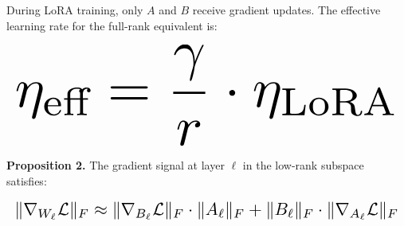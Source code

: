 \documentclass[10pt,twocolumn,letterpaper]{article}
\begin{document}
During LoRA training, only $A$ and $B$ receive gradient updates. The effective learning rate for the full-rank equivalent is:

























\begin{equation}
\resizebox{\columnwidth}{!}{$\displaystyle
\begin{aligned}
\eta_{\text{eff}} = \frac{\gamma}{r} \cdot \eta_{\text{LoRA}}
\end{aligned}
$}
\end{equation}

























\textbf{Proposition 2.} The gradient signal at layer $\ell$ in the low-rank subspace satisfies:

























\begin{equation}
\resizebox{\columnwidth}{!}{$\displaystyle
\begin{aligned}
\|\nabla_{W_\ell}\mathcal{L}\|_F \approx \|\nabla_{B_\ell}\mathcal{L}\|_F \cdot \|A_\ell\|_F + \|B_\ell\|_F \cdot \|\nabla_{A_\ell}\mathcal{L}\|_F
\end{aligned}
$}
\end{equation}
\end{document}
